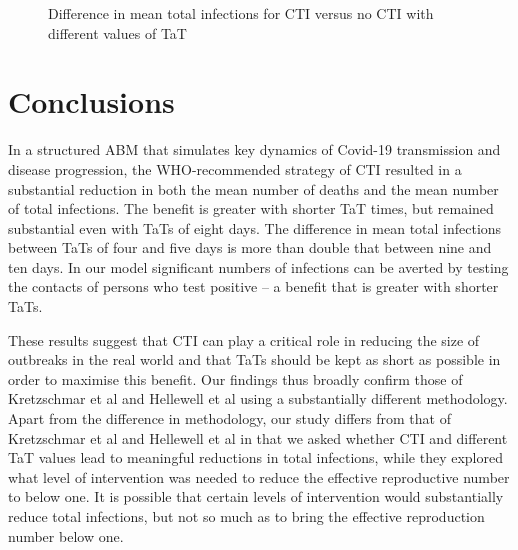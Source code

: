\documentclass{article}
\begin{document}
\begin{figure}
\begin{center}
\end{center}
\caption{Difference in mean total infections for CTI versus no CTI with
  different values of TaT}
\label{fig:comparisonByTaT}
\end{figure}

\section{Conclusions}\label{conclusions}

In a structured ABM that simulates key dynamics of Covid-19 transmission and
disease progression, the WHO-recommended strategy of CTI resulted in a
substantial reduction in both the mean number of deaths and the mean number of
total infections. The benefit is greater with shorter TaT times, but remained
substantial even with TaTs of eight days. The difference in mean total
infections between TaTs of four and five days is more than double that between
nine and ten days. In our model significant numbers of infections can be averted
by testing the contacts of persons who test positive – a benefit that is greater
with shorter TaTs.

These results suggest that CTI can play a critical role in reducing the size of
outbreaks in the real world and that TaTs should be kept as short as possible in
order to maximise this benefit. Our findings thus broadly confirm those of
Kretzschmar et al and Hellewell et al using a substantially different
methodology.\cite{Kretzschmar2020,Hellewell2020} Apart from the difference in
methodology, our study differs from that of Kretzschmar et al and Hellewell et
al in that we asked whether CTI and different TaT values lead to meaningful
reductions in total infections, while they explored what level of intervention
was needed to reduce the effective reproductive number to below one. It is
possible that certain levels of intervention would substantially reduce total
infections, but not so much as to bring the effective reproduction number below
one.
\end{document}
